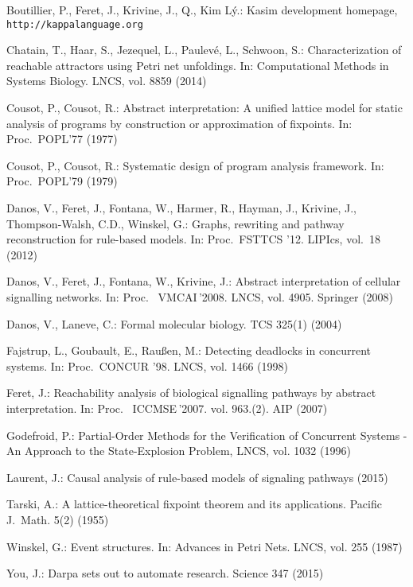 \documentclass[10pt,a4paper]{llncs}
\newcommand{\beforesection}{\vspace*{-4pt}}
\renewcommand{\beforesection}{}
\begin{document}
\vspace*{-5pt}
\beforesection



\beforesection

\begin{thebibliography}{10}
\providecommand{\url}[1]{\texttt{#1}}
\providecommand{\urlprefix}{URL }

Boutillier, P., Feret, J., Krivine, J., Q., {\relax Kim L{\'y}}.: Kasim
  development homepage, \url{http://kappalanguage.org}

Chatain, T., Haar, S., Jezequel, L., Paulev{\'e}, L., Schwoon, S.:
  Characterization of reachable attractors using {P}etri net unfoldings. In:
  Computational Methods in Systems Biology. LNCS, vol. 8859 (2014)

Cousot, P., Cousot, R.: Abstract interpretation: A unified lattice model for
  static analysis of programs by construction or approximation of fixpoints.
  In: Proc.~POPL'77 (1977)

Cousot, P., Cousot, R.: Systematic design of program analysis framework. In:
  Proc.~POPL'79 (1979)

Danos, V., Feret, J., Fontana, W., Harmer, R., Hayman, J., Krivine, J.,
  Thompson-Walsh, C.D., Winskel, G.: Graphs, rewriting and pathway
  reconstruction for rule-based models. In: Proc.~{FSTTCS} '12. LIPIcs, vol.~18
  (2012)

Danos, V., Feret, J., Fontana, W., Krivine, J.: Abstract interpretation of
  cellular signalling networks. In: Proc.~ VMCAI$\,$'2008. LNCS, vol. 4905.
  Springer (2008)

Danos, V., Laneve, C.: Formal molecular biology. TCS  325(1) (2004)

Fajstrup, L., Goubault, E., Rau{\ss}en, M.: Detecting deadlocks in concurrent
  systems. In: Proc.~{CONCUR} '98. LNCS, vol. 1466 (1998)

Feret, J.: Reachability analysis of biological signalling pathways by abstract
  interpretation. In: Proc.~ ICCMSE$\,$'2007. vol. 963.(2). AIP (2007)

Godefroid, P.: Partial-Order Methods for the Verification of Concurrent Systems
  - An Approach to the State-Explosion Problem, LNCS, vol. 1032 (1996)

Laurent, J.: Causal analysis of rule-based models of signaling pathways (2015)

Tarski, A.: A lattice-theoretical fixpoint theorem and its applications.
  Pacific J.~Math.  5(2) (1955)

Winskel, G.: Event structures. In: Advances in Petri Nets. LNCS, vol. 255
  (1987)

You, J.: Darpa sets out to automate research. Science  347 (2015)

\end{thebibliography}
\end{document}
